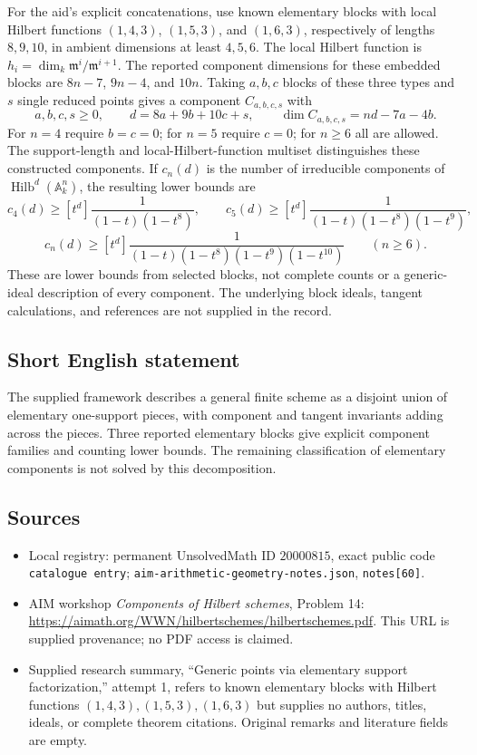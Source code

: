\documentclass[11pt]{article}
\newcommand{\A}{\mathbb{A}}
\begin{document}
For the aid's explicit concatenations, use known elementary blocks with local Hilbert functions \((1,4,3)\), \((1,5,3)\), and \((1,6,3)\), respectively of lengths \(8,9,10\), in ambient dimensions at least \(4,5,6\). The local Hilbert function is \(h_i=\dim_k\mathfrak m^i/\mathfrak m^{i+1}\). The reported component dimensions for these embedded blocks are \(8n-7\), \(9n-4\), and \(10n\). Taking \(a,b,c\) blocks of these three types and \(s\) single reduced points gives a component \(C_{a,b,c,s}\) with
\[
 a,b,c,s\geq0,\qquad d=8a+9b+10c+s,\qquad
 \dim C_{a,b,c,s}=nd-7a-4b.
\]
For \(n=4\) require \(b=c=0\); for \(n=5\) require \(c=0\); for \(n\geq6\) all are allowed. The support-length and local-Hilbert-function multiset distinguishes these constructed components. If \(c_n(d)\) is the number of irreducible components of \(\operatorname{Hilb}^d(\A_k^n)\), the resulting lower bounds are
\[
 c_4(d)\geq[t^d]\frac1{(1-t)(1-t^8)},\qquad
 c_5(d)\geq[t^d]\frac1{(1-t)(1-t^8)(1-t^9)},
\]
\[
 c_n(d)\geq[t^d]\frac1{(1-t)(1-t^8)(1-t^9)(1-t^{10})}\qquad(n\geq6).
\]
These are lower bounds from selected blocks, not complete counts or a generic-ideal description of every component. The underlying block ideals, tangent calculations, and references are not supplied in the record.
\subsection{Short English statement}
The supplied framework describes a general finite scheme as a disjoint union of elementary one-support pieces, with component and tangent invariants adding across the pieces. Three reported elementary blocks give explicit component families and counting lower bounds. The remaining classification of elementary components is not solved by this decomposition.
\subsection{Sources}
\begin{itemize}
\item Local registry: permanent UnsolvedMath ID \(20000815\), exact public code \texttt{catalogue entry}; \texttt{aim-arithmetic-geometry-notes.json}, \texttt{notes[60]}.
\item AIM workshop \emph{Components of Hilbert schemes}, Problem 14: \url{https://aimath.org/WWN/hilbertschemes/hilbertschemes.pdf}. This URL is supplied provenance; no PDF access is claimed.
\item Supplied research summary, ``Generic points via elementary support factorization,'' attempt 1, refers to known elementary blocks with Hilbert functions \((1,4,3),(1,5,3),(1,6,3)\) but supplies no authors, titles, ideals, or complete theorem citations. Original remarks and literature fields are empty.
\end{itemize}
\end{document}
